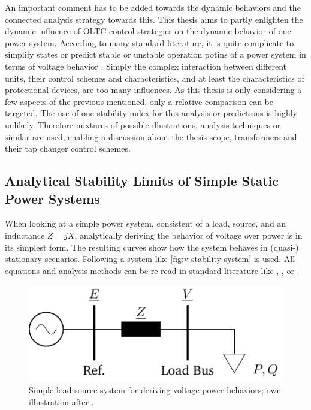 An important comment has to be added towards the dynamic behaviors and the connected analysis strategy towards this.
This thesis aims to partly enlighten the dynamic influence of \acs{OLTC} control strategies on the dynamic behavior of one power system.
According to many standard literature, it is quite complicate to simplify states or predict stable or unstable operation potins of a power system in terms of voltage behavior \autocite{machowski_2020}.
Simply the complex interaction between different units, their control schemes and characteristics, and at least the characteristics of protectional devices, are too many influences.
As this thesis is only considering a few aspects of the previous mentioned, only a relative comparison can be targeted.
The use of one stability index for this analysis or predictions is highly unlikely.
Therefore mixtures of possible illustrations, analysis techniques or similar are used, enabling a discussion about the thesis scope, transformers and their tap changer control schemes.  
        
\subsection{Analytical Stability Limits of Simple Static Power Systems}
\label{sec:analytical-voltage-stability}

When looking at a simple power system, consistent of a load, source, and an inductance $\underline{Z}=jX$, analytically deriving the behavior of voltage over power is in its simplest form.
The resulting curves show how the system behaves in (quasi-) stationary scenarios.
Following a system like \autoref{fig:v-stability-system} is used. 
All equations and analysis methods can be re-read in standard literature like \textcite{machowski_2020}, \textcite{kundur_2022}, or \textcite{cutsem_1998}. 

\begin{figure}[htbp!]
    \centering
    \includegraphics{./tikz_graphics/images/analytical_model.pdf}
    \caption[Simple load source system for deriving voltage power behaviors]{Simple load source system for deriving voltage power behaviors; own illustration after \autocite{machowski_2020,kundur_2022,milano_2010}.}
    \label{fig:v-stability-system}
\end{figure}

